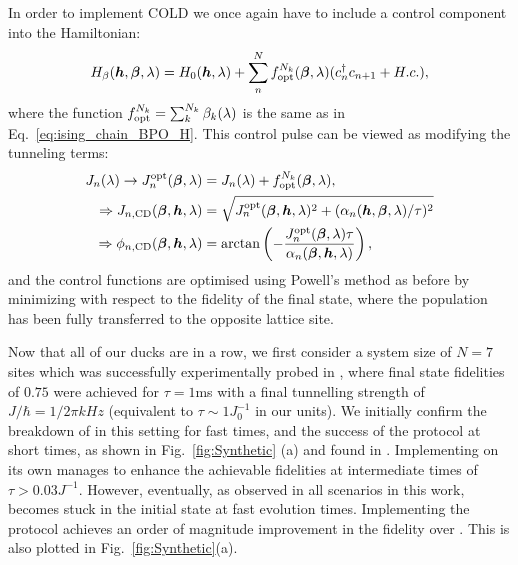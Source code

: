 In order to implement COLD we once again have to include a control component into the Hamiltonian:
\begin{equation}
    \begin{aligned}
        H_{\beta}(\boldsymbol{h}, \boldsymbol{\beta}, \lambda) = H_0(\boldsymbol{h}, \lambda) + \sum_n^N f_{\rm opt}^{N_k}(\boldsymbol{\beta}, \lambda) (c_n^{\dag}c_{n+1} + H.c.),
    \end{aligned}
\end{equation}
where the function $f_{\rm opt}^{N_k} = \sum_k^{N_k} \beta_k(\lambda)$ is the same as in Eq.~\eqref{eq:ising_chain_BPO_H}. This control pulse can be viewed as modifying the tunneling terms:
\begin{equation}\label{eq:synthetic_control_funcs}
    \begin{aligned}
        J_n(\lambda) \rightarrow J_n^{\rm opt}(\boldsymbol{\beta}, \lambda) &= J_n(\lambda) + f_{\rm opt}^{N_k}(\boldsymbol{\beta}, \lambda), \\
        \Rightarrow J_{n, \rm CD}(\boldsymbol{\beta}, \boldsymbol{h}, \lambda) &= \sqrt{J_n^{\rm opt}(\boldsymbol{\beta},\boldsymbol{h}, \lambda)^2 + (\alpha_n(\boldsymbol{h}, \boldsymbol{\beta}, \lambda)/\tau)^2} \\
        \Rightarrow \phi_{n, \mathrm{CD}}(\boldsymbol{\beta}, \boldsymbol{h}, \lambda) &= \arctan\left(-\frac{J_n^{\rm opt}(\boldsymbol{\beta}, \lambda)\tau}{\alpha_n(\boldsymbol{\beta}, \boldsymbol{h}, \lambda)}\right),
    \end{aligned}
\end{equation} 
and the control functions are optimised using Powell's method as before by minimizing with respect to the fidelity of the final state, where the population has been fully transferred to the opposite lattice site. 

Now that all of our ducks are in a row, we first consider a system size of $N=7$ sites which was successfully experimentally probed in \cite{meier_counterdiabatic_2020}, where final state fidelities of $0.75$ were achieved for $\tau = 1$ms with a final tunnelling strength of $J/\hbar = 1/2\pi kHz$ (equivalent to $\tau \sim 1 J_0^{-1}$ in our units). We initially confirm the breakdown of  in this setting for fast times, and the success of the  protocol at short times, as shown in Fig.~\ref{fig:Synthetic} (a) and found in \cite{meier_counterdiabatic_2020}. Implementing  on its own manages to enhance the achievable fidelities at intermediate times of $\tau > 0.03 J^{-1}$. However, eventually, as observed in all scenarios in this work,  becomes stuck in the initial state at fast evolution times. Implementing the  protocol achieves an order of magnitude improvement in the fidelity over . This is also plotted in Fig.~\ref{fig:Synthetic}(a).

